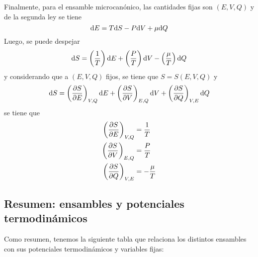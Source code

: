 Finalmente, para el ensamble microcanónico, las cantidades fijas son $(E,V,Q)$ y de la segunda ley se tiene
\begin{equation}
  \dd E=T\dd S-P\dd V+\mu \dd Q
\end{equation}
Luego, se puede despejar
\begin{equation}
  \dd S=\left(\frac{1}{T}\right)\dd E+\left(\frac{P}{T}\right)\dd V-\left(\frac{\mu }{T}\right)\dd Q
\end{equation}
y considerando que a $(E,V,Q)$ fijos, se tiene que $S=S(E,V,Q)$ y 
\begin{equation}
  \dd S=\left(\pdv{S}{E}\right)_{V,Q}\dd E+\left(\pdv{S}{V}\right)_{E,Q}\dd V+\left(\pdv{S}{Q}\right)_{V,E}\dd Q
\end{equation}
se tiene que
\begin{align}
  \left(\pdv{S}{E}\right)_{V,Q}&=\frac{1}{T}\\
  \left(\pdv{S}{V}\right)_{E,Q}&=\frac{P}{T}\\
  \left(\pdv{S}{Q}\right)_{V,E}&=-\frac{\mu }{T}
\end{align} 

\subsection{Resumen: ensambles y potenciales termodinámicos}
Como resumen, tenemos la siguiente tabla que relaciona los distintos ensambles con sus potenciales termodinámicos y variables fijas:


